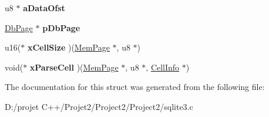 \begin{DoxyCompactItemize}
u8 $\ast$ {\bfseries a\+Data\+Ofst}
\item 
\mbox{\label{struct_mem_page_add322c1aed91e95d8dfe3ac3535d65b4}} 
\mbox{\hyperlink{struct_pg_hdr}{Db\+Page}} $\ast$ {\bfseries p\+Db\+Page}
\item 
\mbox{\label{struct_mem_page_aecb022d01630da5a48681f8a7e32a419}} 
u16($\ast$ {\bfseries x\+Cell\+Size} )(\mbox{\hyperlink{struct_mem_page}{Mem\+Page}} $\ast$, u8 $\ast$)
\item 
\mbox{\label{struct_mem_page_ac401be6009d535d9fef9cc48af734039}} 
void($\ast$ {\bfseries x\+Parse\+Cell} )(\mbox{\hyperlink{struct_mem_page}{Mem\+Page}} $\ast$, u8 $\ast$, \mbox{\hyperlink{struct_cell_info}{Cell\+Info}} $\ast$)
\end{DoxyCompactItemize}


The documentation for this struct was generated from the following file\+:\begin{DoxyCompactItemize}
\item 
D\+:/projet C++/\+Projet2/\+Project2/\+Project2/sqlite3.\+c\end{DoxyCompactItemize}
